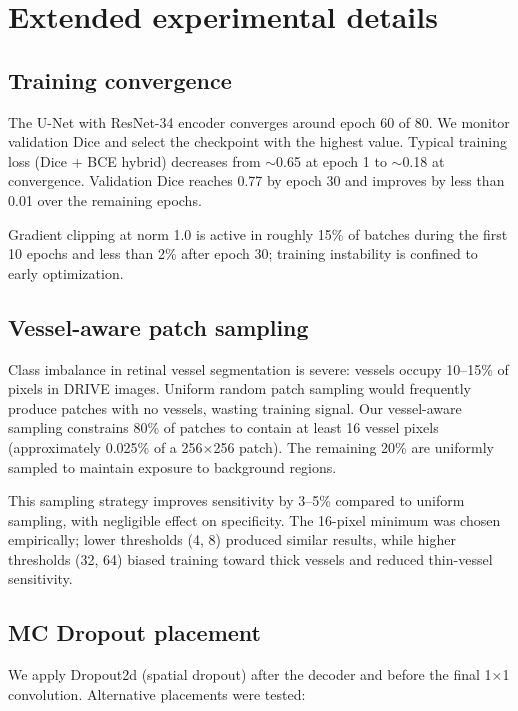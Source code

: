 \section{Extended experimental details}
\label{app:details}

\subsection{Training convergence}

The U-Net with ResNet-34 encoder converges around epoch 60 of 80. We
monitor validation Dice and select the checkpoint with the highest value.
Typical training loss (Dice + BCE hybrid) decreases from $\sim$0.65 at
epoch 1 to $\sim$0.18 at convergence. Validation Dice reaches 0.77 by
epoch 30 and improves by less than 0.01 over the remaining epochs.

Gradient clipping at norm 1.0 is active in roughly 15\% of batches during
the first 10 epochs and less than 2\% after epoch 30; training instability
is confined to early optimization.

\subsection{Vessel-aware patch sampling}

Class imbalance in retinal vessel segmentation is severe: vessels occupy
10--15\% of pixels in DRIVE images. Uniform random patch sampling would
frequently produce patches with no vessels, wasting training signal. Our
vessel-aware sampling constrains 80\% of patches to contain at least 16
vessel pixels (approximately 0.025\% of a 256$\times$256 patch). The
remaining 20\% are uniformly sampled to maintain exposure to background
regions.

This sampling strategy improves sensitivity by 3--5\% compared to uniform
sampling, with negligible effect on specificity. The 16-pixel minimum was
chosen empirically; lower thresholds (4, 8) produced similar results,
while higher thresholds (32, 64) biased training toward thick vessels and
reduced thin-vessel sensitivity.

\subsection{MC Dropout placement}

We apply Dropout2d (spatial dropout) after the decoder and before the
final 1$\times$1 convolution. Alternative placements were tested:

